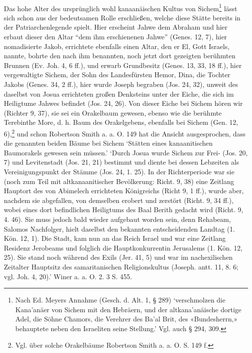 \documentclass[a4paper, 11pt, oneside]{article}
\begin{document}
\paragraph{}
Das hohe Alter des ursprünglich wohl kanaanäischen Kultus von Sichem\footnote{Nach Ed. Meyers Annahme (Gesch. d. Alt. 1, § 289) `verschmolzen die Kana'anäer von Sichem mit den Hebräern, und der altkana'anäische dortige Adel, die Söhne Chamors, die Verehrer des Ba'al Brit, des «Bundesherrn,» behauptete neben den Israeliten seine Stellung.' Vgl. auch § 294, 309.} lässt sich schon aus der bedeutsamen Rolle erschließen, welche diese Stätte bereits in der Patriarchenlegende spielt. Hier erscheint Jahwe dem Abraham und hier erbaut dieser den Altar "`dem ihm erschienenen Jahwe"' (Genes. 12, 7), hier nomadisierte Jakob, errichtete ebenfalls einen Altar, den er El, Gott Israels, nannte, bohrte den nach ihm benannten, noch jetzt dort gezeigten berühmten Brunnen (Ev. Joh. 4, 6 ff.), und erwarb Grundbesitz (Genes. 13, 33, 18 ff.), hier vergewaltigte Sichem, der Sohn des Landesfürsten Hemor, Dina, die Tochter Jakobs (Genes. 34, 2 ff.), hier wurde Joseph begraben (Jos. 24, 32), unweit des daselbst von Josua errichteten großen Denksteins unter der Eiche, die sich im Heiligtume Jahwes befindet (Jos. 24, 26). Von dieser Eiche bei Sichem hören wir (Richter 9, 37), sie sei ein Orakelbaum gewesen, ebenso wie die berühmte Terebinthe More, d. h. Baum des Orakelgebens, ebenfalls bei Sichem (Gen. 12, 6),\footnote{Vgl. über solche Orakelbäume Robertson Smith a. a. O. S. 149 f.} und schon Robertson Smith a. a. O. 149 hat die Ansicht ausgesprochen, dass die genannten beiden Bäume bei Sichem `Stätten eines kanaanitischen Baumorakels gewesen sein müssen.' `Durch Josua wurde Sichem zur Frei- (Jos. 20, 7) und Levitenstadt (Jos. 21, 21) bestimmt und diente bei dessen Lebzeiten als Vereinigungspunkt der Stämme (Jos. 24, 1. 25). In der Richterperiode war sie (noch zum Teil mit altkanaanitischer Bevölkerung: Richt. 9, 38) eine Zeitlang Hauptort des von Abimelech errichteten Königreichs (Richt 9, 1 ff.), wurde aber, nachdem sie abgefallen, von demselben erobert und zerstört (Richt. 9, 34 ff.), wobei eines dort befindlichen Heiligtums des Baal Berith gedacht wird (Richt. 9, 4. 46). Sie muss jedoch bald wieder aufgebaut worden sein, denn Rehabeam, Salomos Nachfolger, hielt daselbst den bekannten entscheidenden Landtag (1. Kön. 12, 1). Die Stadt, kam nun an das Reich Israel und war eine Zeitlang Residenz Jerobeams und folglich die Hauptkonkurrentin Jerusalems (1. Kön. 12, 25). Sie stand noch während des Exils (Jer. 41, 5) und war im nachexilischen Zeitalter Hauptsitz des samaritanischen Religionskultus (Joseph. antt. 11, 8. 6; vgl. Joh. 4, 20).' Winer a. a. O. 2. 3 S. 455.
\end{document}
